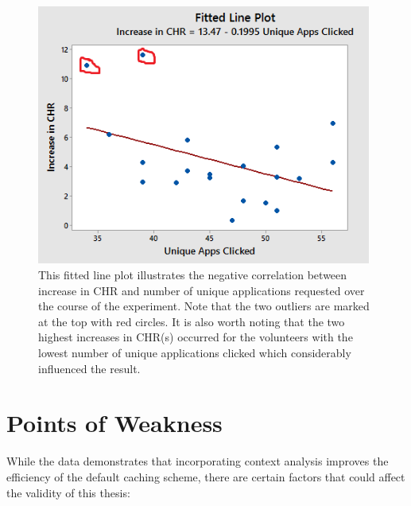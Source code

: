 \documentclass[12pt]{uthesis-v12}  %
\begin{document}
				\begin{figure}[h]
					\centering
					\includegraphics[width = 110mm]{images/uniqueAppsPlot.png}
					\caption[Increase in CHR vs Unique Applications Requested - Plot]{This fitted line plot illustrates the negative correlation between increase in CHR and number of unique applications requested over the course of the experiment. Note that the two outliers are marked at the top with red circles. It is also worth noting that the two highest increases in CHR(s) occurred for the volunteers with the lowest number of unique applications clicked which considerably influenced the result.}
				\end{figure}

\chapter{Points of Weakness}
	While the data demonstrates that incorporating context analysis improves the efficiency of the default caching scheme, there are certain factors that could affect the validity of this thesis:
	
\end{document}
